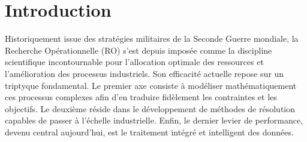 \documentclass[12pt, a4paper, twoside]{report}
\numberwithin{equation}{section}
\begin{document}
	
	\vspace*{\fill}
	
	\clearpage
	\restoregeometry
	
	\clearpage
	\tableofcontents
	\thispagestyle{empty}
	
	\clearpage
	\listoffigures
	
	\clearpage
	\listoftables
	
	
	\clearpage
	
	
	\section*{Introduction}
	
	Historiquement issue des stratégies militaires de la Seconde Guerre mondiale, la Recherche Opérationnelle (RO) s'est depuis imposée comme la discipline scientifique incontournable pour l'allocation optimale des ressources et l'amélioration des processus industriels.
	Son efficacité actuelle repose sur un triptyque fondamental. Le premier axe consiste à modéliser mathématiquement ces processus complexes afin d'en traduire fidèlement les contraintes et les objectifs.
	Le deuxième réside dans le développement de méthodes de résolution capables de passer à l'échelle industrielle. Enfin, le dernier levier de performance, devenu central aujourd'hui, est le traitement intégré et intelligent des données.
	
\end{document}
